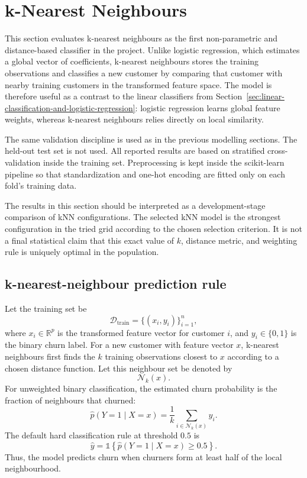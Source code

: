 \newpage
\section{k-Nearest Neighbours}
\label{sec:knn}

This section evaluates k-nearest neighbours as the first non-parametric and distance-based classifier in the project. Unlike logistic regression, which estimates a global vector of coefficients, k-nearest neighbours stores the training observations and classifies a new customer by comparing that customer with nearby training customers in the transformed feature space. The model is therefore useful as a contrast to the linear classifiers from Section~\ref{sec:linear-classification-and-logistic-regression}: logistic regression learns global feature weights, whereas k-nearest neighbours relies directly on local similarity.

The same validation discipline is used as in the previous modelling sections. The held-out test set is not used. All reported results are based on stratified cross-validation inside the training set. Preprocessing is kept inside the scikit-learn pipeline so that standardization and one-hot encoding are fitted only on each fold's training data.

The results in this section should be interpreted as a development-stage comparison of kNN configurations. The selected kNN model is the strongest configuration in the tried grid according to the chosen selection criterion. It is not a final statistical claim that this exact value of \(k\), distance metric, and weighting rule is uniquely optimal in the population.

\subsection{k-nearest-neighbour prediction rule}

Let the training set be
\[
\mathcal{D}_{\mathrm{train}}
=
\{(x_i,y_i)\}_{i=1}^{n},
\]
where \(x_i \in \mathbb{R}^{p}\) is the transformed feature vector for customer \(i\), and \(y_i \in \{0,1\}\) is the binary churn label. For a new customer with feature vector \(x\), k-nearest neighbours first finds the \(k\) training observations closest to \(x\) according to a chosen distance function. Let this neighbour set be denoted by
\[
\mathcal{N}_k(x).
\]
For unweighted binary classification, the estimated churn probability is the fraction of neighbours that churned:
\[
\widehat{p}(Y=1 \mid X=x)
=
\frac{1}{k}
\sum_{i \in \mathcal{N}_k(x)} y_i.
\]
The default hard classification rule at threshold \(0.5\) is
\[
\widehat{y}
=
\mathbb{1}
\left\{
\widehat{p}(Y=1 \mid X=x) \geq 0.5
\right\}.
\]
Thus, the model predicts churn when churners form at least half of the local neighbourhood.

